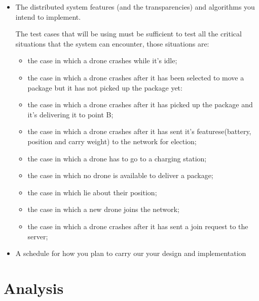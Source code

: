 \documentclass[a4paper, oneside]{memoir}
\begin{document}
\begin{itemize}
\item The distributed system features (and the transparencies) and algorithms you intend to implement.


The test cases that will be using must be sufficient to test all the critical situations that the system can encounter, those situations are:
\begin{itemize}
\item the case in which a drone crashes while it's idle;
\item the case in which a drone crashes after it has been selected to move a package but it has not picked up the package yet:
\item the case in which a drone crashes after it has picked up the package and it's delivering it to point B;
\item the case in which a drone crashes after it has sent it's featurese(battery, position and carry weight) to the network for election;
\item the case in which a drone has to go to a charging station;
\item the case in which no drone is available to deliver a package;
\item the case in which lie about their position;
\item the case in which a new drone joins the network;
\item the case in which a drone crashes after it has sent a join request to the server;
\end{itemize}




\item A schedule for how you plan to carry our your design and implementation
\end{itemize}



\chapter{Analysis}\label{ch:analysis}

\end{document}
